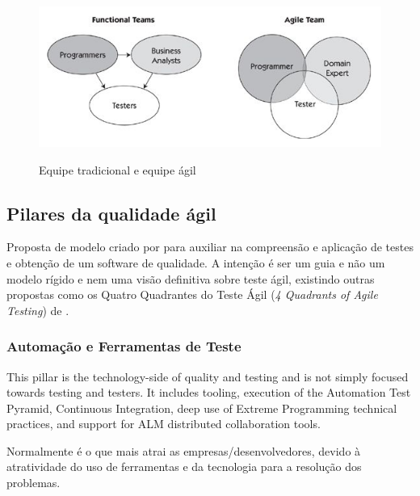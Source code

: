 \documentclass[
	12pt,				%
	openright,			%
	oneside,			%
	a4paper,			%
	english,			%
	brazil,				%
	]{abntex2}
\begin{document}

\begin{figure}[H]
    \centering
    \caption{Equipe tradicional e equipe ágil}
    \graphicspath{ {./graphics/agile/} }
    \includegraphics[scale=1.0]{functional-and-agile-teams}
    \label{fig:functional-and-agile-teams}
\end{figure}








\subsection{Pilares da qualidade ágil}
Proposta de modelo criado por  para auxiliar na compreensão e aplicação de testes e obtenção de um software de qualidade. A intenção é ser um guia e não um modelo rígido e nem uma visão definitiva sobre teste ágil, existindo outras propostas como os Quatro Quadrantes do Teste Ágil (\emph{4 Quadrants of Agile Testing}) de .

\subsubsection{Automação e Ferramentas de Teste}
This pillar is the technology-side of quality and testing and is not simply focused towards testing and testers. It includes tooling, execution of the Automation Test Pyramid, Continuous Integration, deep use of Extreme Programming technical practices, and support for ALM distributed collaboration tools.

Normalmente é o que mais atrai as empresas/desenvolvedores, devido à atratividade do uso de ferramentas e da tecnologia para a resolução dos problemas.
\end{document}
